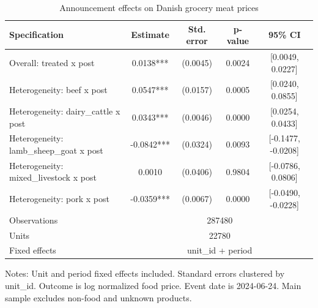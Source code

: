 \begin{table}[htbp]
\centering
\caption{Announcement effects on Danish grocery meat prices}
\begin{tabular}{lcccc}
\hline
Specification & Estimate & Std. error & p-value & 95\% CI \\
\hline
Overall: treated x post & 0.0138*** & (0.0045) & 0.0024 & [0.0049, 0.0227] \\
Heterogeneity: beef x post & 0.0547*** & (0.0157) & 0.0005 & [0.0240, 0.0855] \\
Heterogeneity: dairy_cattle x post & 0.0343*** & (0.0046) & 0.0000 & [0.0254, 0.0433] \\
Heterogeneity: lamb_sheep_goat x post & -0.0842*** & (0.0324) & 0.0093 & [-0.1477, -0.0208] \\
Heterogeneity: mixed_livestock x post & 0.0010 & (0.0406) & 0.9804 & [-0.0786, 0.0806] \\
Heterogeneity: pork x post & -0.0359*** & (0.0067) & 0.0000 & [-0.0490, -0.0228] \\
\hline
Observations & \multicolumn{4}{c}{287480} \\
Units & \multicolumn{4}{c}{22780} \\
Fixed effects & \multicolumn{4}{c}{unit_id + period} \\
\hline
\end{tabular}
\begin{minipage}{0.9\linewidth}\footnotesize Notes: Unit and period fixed effects included. Standard errors clustered by unit_id. Outcome is log normalized food price. Event date is 2024-06-24. Main sample excludes non-food and unknown products.\end{minipage}
\end{table}